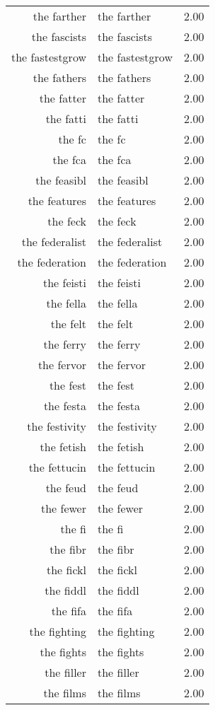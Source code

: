 \begin{table}[ht]
\begin{tabular}{rlr}
  the farther & the farther & 2.00 \\ 
  the fascists & the fascists & 2.00 \\ 
  the fastestgrow & the fastestgrow & 2.00 \\ 
  the fathers & the fathers & 2.00 \\ 
  the fatter & the fatter & 2.00 \\ 
  the fatti & the fatti & 2.00 \\ 
  the fc & the fc & 2.00 \\ 
  the fca & the fca & 2.00 \\ 
  the feasibl & the feasibl & 2.00 \\ 
  the features & the features & 2.00 \\ 
  the feck & the feck & 2.00 \\ 
  the federalist & the federalist & 2.00 \\ 
  the federation & the federation & 2.00 \\ 
  the feisti & the feisti & 2.00 \\ 
  the fella & the fella & 2.00 \\ 
  the felt & the felt & 2.00 \\ 
  the ferry & the ferry & 2.00 \\ 
  the fervor & the fervor & 2.00 \\ 
  the fest & the fest & 2.00 \\ 
  the festa & the festa & 2.00 \\ 
  the festivity & the festivity & 2.00 \\ 
  the fetish & the fetish & 2.00 \\ 
  the fettucin & the fettucin & 2.00 \\ 
  the feud & the feud & 2.00 \\ 
  the fewer & the fewer & 2.00 \\ 
  the fi & the fi & 2.00 \\ 
  the fibr & the fibr & 2.00 \\ 
  the fickl & the fickl & 2.00 \\ 
  the fiddl & the fiddl & 2.00 \\ 
  the fifa & the fifa & 2.00 \\ 
  the fighting & the fighting & 2.00 \\ 
  the fights & the fights & 2.00 \\ 
  the filler & the filler & 2.00 \\ 
  the films & the films & 2.00 \\ 

\end{tabular}
\end{table}
